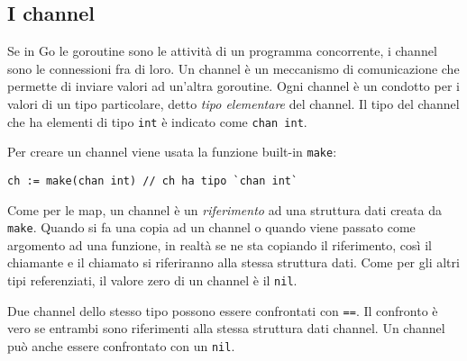 \documentclass[../../thesis.tex]{subfiles}
\begin{document}
    \subsection{I channel}\label{subsec:i-channel}
    Se in Go le goroutine sono le attività di un programma concorrente, i channel sono le connessioni fra di loro.
    Un channel è un meccanismo di comunicazione che permette di inviare valori ad un'altra goroutine.
    Ogni channel è un condotto per i valori di un tipo particolare, detto \textit{tipo elementare} del channel.
    Il tipo del channel che ha elementi di tipo \verb"int" è indicato come \verb"chan int".
    \hfill \vspace{12pt}

    Per creare un channel viene usata la funzione built-in \verb"make":
    \begin{lstlisting}[frame = single,label={lst:lstlisting7-4.1}]
ch := make(chan int) // ch ha tipo `chan int`
    \end{lstlisting}
    Come per le map, un channel è un \textit{riferimento} ad una struttura dati creata da \verb"make".
    Quando si fa una copia ad un channel o quando viene passato come argomento ad una funzione, in realtà se ne sta copiando il riferimento, così il chiamante e il chiamato si riferiranno alla stessa struttura dati.
    Come per gli altri tipi referenziati, il valore zero di un channel è il \verb"nil".
    \hfill \vspace{12pt}

    Due channel dello stesso tipo possono essere confrontati con \verb"==".
    Il confronto è vero se entrambi sono riferimenti alla stessa struttura dati channel.
    Un channel può anche essere confrontato con un \verb"nil".
    \hfill \vspace{12pt}
\end{document}
